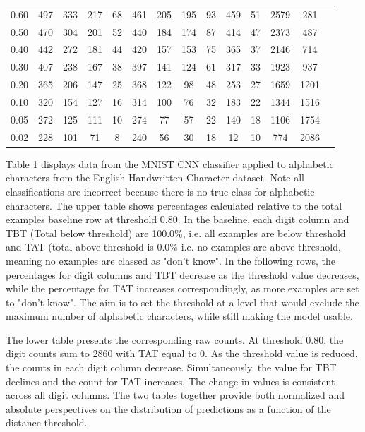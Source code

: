 \begin{table}[ht]
\begin{tabular}{lccccccccccccc}
0.60   & 497 & 333 & 217 & 68  & 461 & 205 & 195 & 93  & 459 & 51  & 2579 & 281 \\
0.50   & 470 & 304 & 201 & 52  & 440 & 184 & 174 & 87  & 414 & 47  & 2373 & 487 \\
0.40   & 442 & 272 & 181 & 44  & 420 & 157 & 153 & 75  & 365 & 37  & 2146 & 714 \\
0.30   & 407 & 238 & 167 & 38  & 397 & 141 & 124 & 61  & 317 & 33  & 1923 & 937 \\
0.20   & 365 & 206 & 147 & 25  & 368 & 122 & 98  & 48  & 253 & 27  & 1659 & 1201\\
0.10   & 320 & 154 & 127 & 16  & 314 & 100 & 76  & 32  & 183 & 22  & 1344 & 1516\\
0.05   & 272 & 125 & 111 & 10  & 274 & 77  & 57  & 22  & 140 & 18  & 1106 & 1754\\
0.02   & 228 & 101 & 71  & 8   & 240 & 56  & 30  & 18  & 12  & 10  & 774  & 2086\\
\bottomrule
\end{tabular}
\label{app:alphabetic_mnist_cnn_misclassifications}
\end{table}

Table \ref{app:alphabetic_mnist_cnn_misclassifications} displays data from the MNIST CNN classifier applied to alphabetic characters from the English Handwritten Character dataset. Note all classifications are incorrect because there is no true class for alphabetic characters. The upper table shows percentages calculated relative to the total examples baseline row at threshold 0.80. In the baseline, each digit column and TBT (Total below threshold) are 100.0\%, i.e. all examples are below threshold and TAT (total above threshold is 0.0\% i.e. no examples are above threshold, meaning no examples are classed as "don't know". In the following rows, the percentages for digit columns and TBT decrease as the threshold value decreases, while the percentage for TAT increases correspondingly, as more examples are set to "don't know". The aim is to set the threshold at a level that would exclude the maximum number of alphabetic characters, while still making the model usable.

The lower table presents the corresponding raw counts. At threshold 0.80, the digit counts sum to 2860 with TAT equal to 0. As the threshold value is reduced, the counts in each digit column decrease. Simultaneously, the value for TBT declines and the count for TAT increases. The change in values is consistent across all digit columns. The two tables together provide both normalized and absolute perspectives on the distribution of predictions as a function of the distance threshold.

